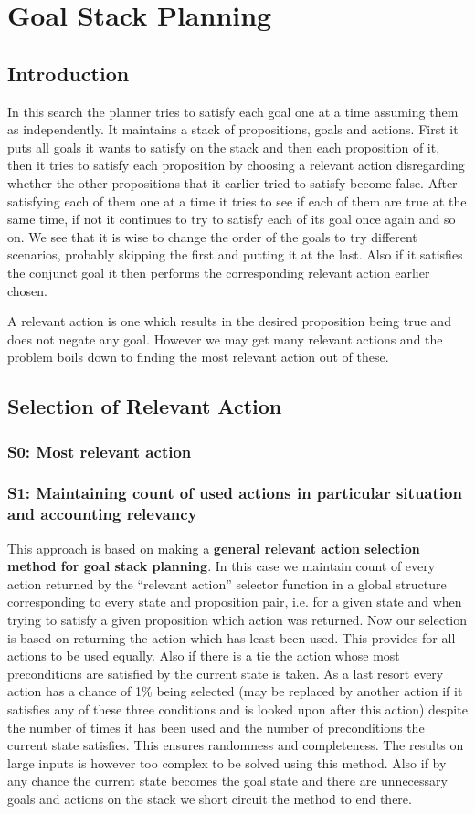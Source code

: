 \documentclass{article}
\begin{document}
\section{Goal Stack Planning}
\subsection{Introduction}
In this search the planner tries to satisfy each goal one at a time assuming them as independently. It maintains a stack of propositions, goals and actions. First it puts all goals it wants to satisfy on the stack and then each proposition of it, then it tries to satisfy each proposition by choosing a relevant action disregarding whether the other propositions that it earlier tried to satisfy become false. After satisfying each of them one at a time it tries to see if each of them are true at the same time, if not it continues to try to satisfy each of its goal once again and so on. We see that it is wise to change the order of the goals to try different scenarios, probably skipping the first and putting it at the last. Also if it satisfies the conjunct goal it then performs the corresponding relevant action earlier chosen. 

A relevant action is one which results in the desired proposition being true and does not negate any goal. However we may get many relevant actions and the problem boils down to finding the most relevant action out of these.

\subsection{Selection of Relevant Action}
\subsubsection{S0: Most relevant action}
\subsubsection{S1: Maintaining count of used actions in particular situation and accounting relevancy}
This approach is based on making a {\bf general relevant action selection method for goal stack planning}. In this case we maintain count of every action returned by the ``relevant action'' selector function in a global structure corresponding to every state and proposition pair, i.e. for a given state and when trying to satisfy a given proposition which action was returned. Now our selection is based on returning the action which has least been used. This provides for all actions to be used equally. Also if there is a tie the action whose most preconditions are satisfied by the current state is taken. As a last resort every action has a chance of 1\% being selected  (may be replaced by another action if it satisfies any of these three conditions and is looked upon after this action) despite the number of times it has been used and the number of preconditions the current state satisfies. This ensures randomness and completeness. The results on large inputs is however too complex to be solved using this method. Also if by any chance the current state becomes the goal state and there are unnecessary goals and actions on the stack we short circuit the method to end there.
\end{document}
